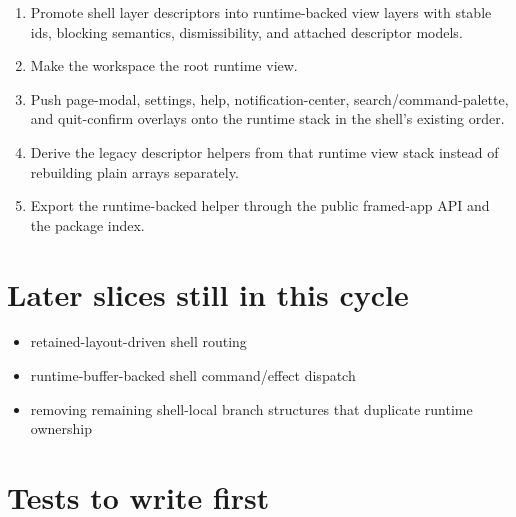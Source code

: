\begin{enumerate}
\def\labelenumi{\arabic{enumi}.}
\tightlist
\item
  Promote shell layer descriptors into runtime-backed view layers with stable ids, blocking semantics, dismissibility, and attached descriptor models.
\item
  Make the workspace the root runtime view.
\item
  Push page-modal, settings, help, notification-center, search/command-palette, and quit-confirm overlays onto the runtime stack in the shell's existing order.
\item
  Derive the legacy descriptor helpers from that runtime view stack instead of rebuilding plain arrays separately.
\item
  Export the runtime-backed helper through the public framed-app API and the package index.
\end{enumerate}

\section{Later slices still in this cycle}\label{record-155-later-slices-still-in-this-cycle}

\begin{itemize}
\tightlist
\item
  retained-layout-driven shell routing
\item
  runtime-buffer-backed shell command/effect dispatch
\item
  removing remaining shell-local branch structures that duplicate runtime ownership
\end{itemize}

\section{Tests to write first}\label{record-155-tests-to-write-first}

